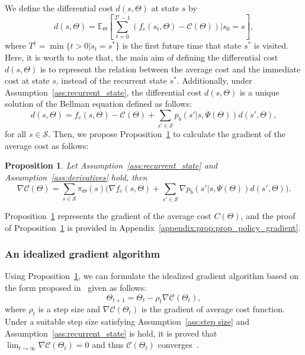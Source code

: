 \documentclass[twocolumn,10pt]{IEEEtran}
\newtheorem{proposition}{Proposition} %
\begin{document}
We define the differential cost $d(s,\Theta)$ at state $s$ by
\begin{equation}
d(s, \Theta) = \mathbb{E}_{\Theta} \left[ \sum_{t=0}^{T^{\dagger}-1} \left( 	f_c (s_t, \Theta) - \mathcal{C} (\Theta)	\right) | s_{0} = s \right]	,
\end{equation} 
where $T^{\dagger}=\min\{t>0 | s_t = s^{*}\}$ is the first future time that state $s^{*}$ is visited. Here, it is worth to note that, the main aim of defining the differential cost $d(s, \Theta)$ is to represent the relation between the average cost and the immediate cost at state $s$, instead of the recurrent state $s^{*}$. Additionally, under Assumption~\ref{ass:recurrent_state}, the differential cost $d(s, \Theta) $ is a unique solution of the Bellman equation defined as follows:
\begin{equation}
d(s, \Theta)  = f_c (s, \Theta) - \mathcal{C} (\Theta)+\sum_{s' \in \mathcal{S}} p_b (s'|s,\Psi(\Theta)) d(s', \Theta)	,
\end{equation}
for all $s \in \mathcal{S}$. Then, we propose Proposition~\ref{prop:prop_policy_gradient} to calculate the gradient of the average cost as follows:
\begin{proposition}
	\label{prop:prop_policy_gradient}
	Let Assumption~\ref{ass:recurrent_state} and Assumption~\ref{ass:derivatives} hold, then \\
	\begin{equation}
	\nabla \mathcal{C} (\Theta) = \sum_{s \in \mathcal{S}} \pi_{\Theta}(s) \Big(\nabla f_c (s, \Theta) + \sum_{s' \in \mathcal{S}} \nabla p_b (s'|s,\Psi(\Theta)) d(s', \Theta)  \Big) 	.
	\end{equation}
\end{proposition}
Proposition~\ref{prop:prop_policy_gradient} represents the gradient of the average cost $C(\Theta)$, and the proof of Proposition~\ref{prop:prop_policy_gradient} is provided in Appendix~\ref{appendix:prop:prop_policy_gradient}.


\subsubsection{An idealized gradient algorithm}

Using Proposition~\ref{prop:prop_policy_gradient}, we can formulate the idealized gradient algorithm based on the form proposed in~\cite{Bertsekas_1995_Nonlinearprogramming} given as follows:
\begin{equation}
\label{idealized_algorithm_theta}
\Theta_{t+1} = \Theta_{t} - \rho_{t} \nabla \mathcal{C} (\Theta_{t})	,
\end{equation}
where $\rho_{t}$ is a step size and $\nabla \mathcal{C} (\Theta_{t})$ is the gradient of average cost function. Under a suitable step size satisfying Assumption~\ref{ass:step size} and Assumption~\ref{ass:recurrent_state} is hold, it is proved that $\lim_{t \rightarrow \infty} \nabla \mathcal{C}(\Theta_{t}) = 0$ and thus $\mathcal{C}(\Theta_{t})$ converges~\cite{Bertsekas_1995_Nonlinearprogramming}.
\end{document}
